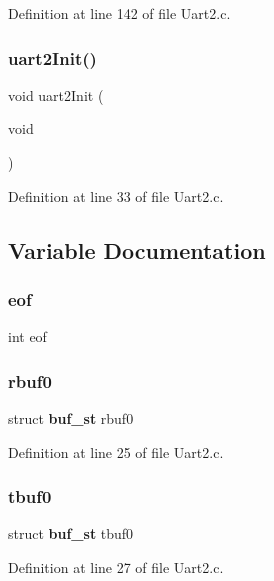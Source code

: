 Definition at line 142 of file Uart2.\+c.

\mbox{\label{_uart2_8c_a084e270b15f2aa6e0beebda5d92976fd}} 
\subsubsection{uart2\+Init()}
{\footnotesize\ttfamily void uart2\+Init (\begin{DoxyParamCaption}\item[{void}]{ }\end{DoxyParamCaption})}



Definition at line 33 of file Uart2.\+c.



\subsection{Variable Documentation}
\mbox{\label{_uart2_8c_a15057793e4b0eb3b08c0b1797be8abc4}} 
\subsubsection{eof}
{\footnotesize\ttfamily int eof}

\mbox{\label{_uart2_8c_ab50246253eddcb64b89f884049fcf82c}} 
\subsubsection{rbuf0}
{\footnotesize\ttfamily struct \textbf{ buf\+\_\+st} rbuf0}



Definition at line 25 of file Uart2.\+c.

\mbox{\label{_uart2_8c_a2f02ca9d14404a2e9b3f8652a94bfff7}} 
\subsubsection{tbuf0}
{\footnotesize\ttfamily struct \textbf{ buf\+\_\+st} tbuf0}



Definition at line 27 of file Uart2.\+c.

